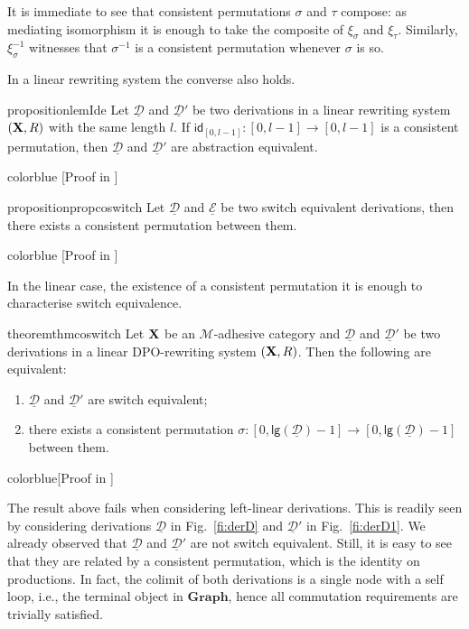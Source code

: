 \documentclass[a4paper,UKenglish,cleveref,pdftex,thm-restate,numberwithinsect]{lipics-v2021}
\newcommand{\full}[1]{{color{blue}#1}}
\newcommand{\full}[1]{}
\newcommand{\cat}[1]{\ensuremath{\mathbf{#1}}}
\newcommand{\id}[1]{\mathsf{id}_{#1}}
\def\R{\mathsf{R}}
\def\X{\textbf {\textup{X}}}
\newcommand{\dder}[1]{\mathscr{#1}}
\newcommand{\der}[1]{\underline{\dder{#1}}}
\newcommand{\lgh}[0]{\mathsf{lg}}
\begin{document}
\begin{remark}\label{rem:compo}
	It is immediate to see that consistent permutations $\sigma$ and $\tau$ compose: as mediating isomorphism it is enough to take the composite of $\xi_{\sigma}$ and $\xi_\tau$. Similarly, $\xi^{-1}_{\sigma}$ witnesses that $\sigma^{-1}$ is a consistent permutation whenever $\sigma$ is so.
\end{remark}
In a linear rewriting system the converse also holds.

\begin{restatable}{proposition}{lemIde}\label{lem:ide}
	Let $\der{D}$ and $\der{D}'$ be two derivations in a linear rewriting system $(\X, \R)$ with the same length $l$. If $\id{[0,l-1]}:[0,l-1]\to [0,l-1]$ is a consistent permutation, then $\der{D}$ and $\der{D}'$ are abstraction equivalent.  
\end{restatable}

\full{
[Proof in ]
}

\begin{restatable}{proposition}{propcoswitch}\label{prop:coswitch}
Let $\der{D}$ and $\der{E}$ be two switch equivalent derivations, then there exists a consistent permutation between them.
\end{restatable}	

\full{
[Proof in ]
}

In the linear case, the existence of a consistent permutation it is enough to characterise switch equivalence. 


\begin{restatable}{theorem}{thmcoswitch}
Let $\X$ be an $\mathcal{M}$-adhesive category and 
$\der{D}$ and $\der{D}'$ be two derivations in a linear DPO-rewriting system $(\X, \R)$. 
Then the following are equivalent:
\begin{enumerate}
	\item $\der{D}$ and $\der{D}'$ are switch equivalent;
	\item there exists a consistent permutation $\sigma\colon [0,\lgh(\der{D})-1]\to [0,\lgh(\der{D})-1]$ between them.
\end{enumerate}
\end{restatable}

\full{[Proof in ]}


\begin{example}
  The result above fails when considering left-linear
  derivations. This is readily seen by considering derivations
  $\der{D}$ in Fig.~\ref{fi:derD} and $\der{D}'$ in
  Fig.~\ref{fi:derD1}. We already observed that
  $\der{D}$ and $\der{D}'$ are not switch equivalent.
  Still, it is easy to see that they are related by a consistent
  permutation, which is the identity on productions. In fact, the colimit of
  both derivations is a single node with a self loop, i.e., the
  terminal object in $\cat{Graph}$, hence all commutation requirements
  are trivially satisfied.
\end{example}
\end{document}
